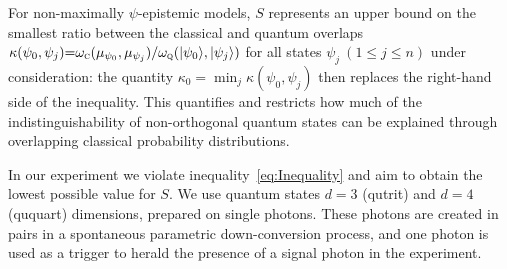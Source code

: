 \documentclass[aps,prl,floatfix,twocolumn,tightenlines,amsmath,amssymb,nofootinbib]{revtex4-1}
\newcommand{\ket}[1] {| #1 \rangle}
\begin{document}
For non-maximally $\psi$-epistemic models, $S$ represents an upper bound on the smallest ratio between the classical and quantum overlaps $\kappa(\psi_0,\psi_j){=}\omega_{\textsc{c}}(\mu_{\psi_0},\mu_{\psi_j})/ \omega_{\textsc{q}}(\ket{\psi_0},\ket{\psi_j})$ for all states $\psi_j \ (1\leq j\leq n)$ under consideration: the quantity $\kappa_0 = \min_j \kappa(\psi_0,\psi_j)$ then replaces the right-hand side of the inequality\cite{Branciard2014a}. This quantifies and restricts how much of the indistinguishability of non-orthogonal quantum states can be explained through overlapping classical probability distributions.

In our experiment we violate inequality~\eqref{eq:Inequality} and aim to obtain the lowest possible value for $S$. We use quantum states $d{=}3$ (qutrit) and $d{=}4$ (ququart) dimensions, prepared on single photons. These photons are created in pairs in a spontaneous parametric down-conversion process, and one photon is used as a trigger to herald the presence of a signal photon in the experiment. 
\end{document}
